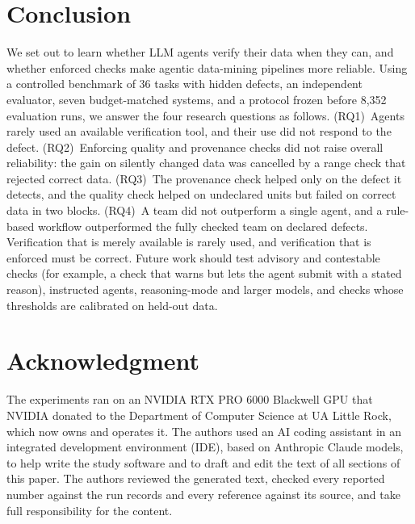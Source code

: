 \documentclass[conference]{IEEEtran}
\begin{document}
\section{Conclusion}
We set out to learn whether LLM agents verify their data when they can, and whether enforced checks make agentic
data-mining pipelines more reliable. Using a controlled benchmark of 36 tasks with hidden defects, an independent
evaluator, seven budget-matched systems, and a protocol frozen before 8,352 evaluation runs, we answer the four
research questions as follows. (RQ1)~Agents rarely used an available verification tool, and their use did not respond
to the defect. (RQ2)~Enforcing quality and provenance checks did not raise overall reliability: the gain on silently
changed data was cancelled by a range check that rejected correct data. (RQ3)~The provenance check helped only on the
defect it detects, and the quality check helped on undeclared units but failed on correct data in two blocks. (RQ4)~A team did not
outperform a single agent, and a rule-based workflow outperformed the fully checked team on declared defects.
Verification that is merely available is rarely used, and verification that is enforced must be correct. Future work
should test advisory and contestable checks (for example, a check that warns but lets the agent submit with a stated
reason), instructed agents, reasoning-mode and larger models, and checks whose thresholds are calibrated on held-out
data.

\section*{Acknowledgment}
The experiments ran on an NVIDIA RTX PRO 6000 Blackwell GPU that NVIDIA donated to the Department of Computer
Science at UA Little Rock, which now owns and operates it.
The authors used an AI coding assistant in an integrated development environment (IDE), based on Anthropic Claude
models, to help write the study software and to draft and edit the text of all sections of this paper. The authors reviewed the generated text, checked every reported
number against the run records and every reference against its source, and take full responsibility for the
content.



\end{document}
